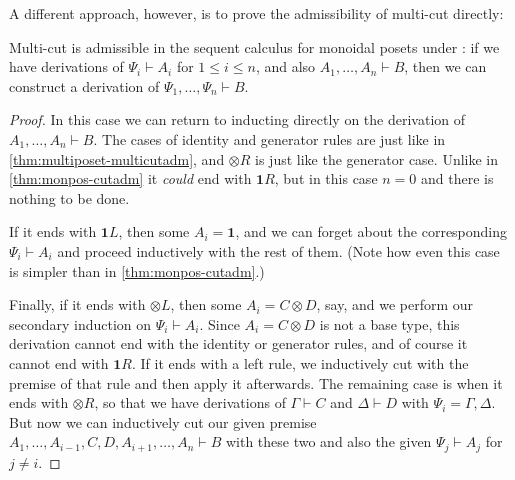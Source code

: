 \documentclass{book}
\let\types\vdash
\def\one{\mathbf{1}}
\let\tensor\otimes
\def\tensorL{\mathord{\tensor}L}
\def\tensorR{\mathord{\tensor}R}
\begin{document}
A different approach, however, is to prove the admissibility of multi-cut directly:

\begin{thm}\label{thm:monpos-multicutadm}
  Multi-cut is admissible in the sequent calculus for monoidal posets under \cG: if we have derivations of $\Psi_i\types A_i$ for $1\le i\le n$, and also $A_1,\dots,A_n \types B$, then we can construct a derivation of $\Psi_1,\dots,\Psi_n\types B$.
\end{thm}
\begin{proof}
  In this case we can return to inducting directly on the derivation of $A_1,\dots,A_n \types B$.
  The cases of identity and generator rules are just like in \cref{thm:multiposet-multicutadm}, and $\tensorR$ is just like the generator case.
  Unlike in \cref{thm:monpos-cutadm} it \emph{could} end with $\one R$, but in this case $n=0$ and there is nothing to be done.

  If it ends with $\one L$, then some $A_i = \one$, and we can forget about the corresponding $\Psi_i\types A_i$ and proceed inductively with the rest of them.
  (Note how even this case is simpler than in \cref{thm:monpos-cutadm}.)

  Finally, if it ends with $\tensorL$, then some $A_i = C\tensor D$, say, and we perform our secondary induction on $\Psi_i\types A_i$.
  Since $A_i=C\tensor D$ is not a base type, this derivation cannot end with the identity or generator rules, and of course it cannot end with $\one R$.
  If it ends with a left rule, we inductively cut with the premise of that rule and then apply it afterwards.
  The remaining case is when it ends with $\tensorR$, so that we have derivations of $\Gamma\types C$ and $\Delta\types D$ with $\Psi_i = \Gamma,\Delta$.
  But now we can inductively cut our given premise $A_1,\dots,A_{i-1},C,D,A_{i+1},\dots,A_n \types B$ with these two and also the given $\Psi_j\types A_j$ for $j\neq i$.
\end{proof}
\end{document}
